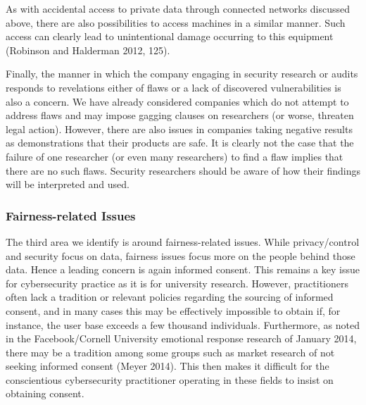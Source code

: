 \documentclass{svjour3}                     %
\begin{document}
As with accidental access to private data through connected networks discussed above, there are also possibilities to access machines in a similar manner. Such access can clearly lead to unintentional damage occurring to this equipment (Robinson and Halderman 2012, 125).

Finally, the manner in which the company engaging in security research or audits responds to revelations either of flaws or a lack of discovered vulnerabilities is also a concern. We have already considered companies which do not attempt to address flaws and may impose gagging clauses on researchers (or worse, threaten legal action). However, there are also issues in companies taking negative results as demonstrations that their products are safe. It is clearly not the case that the failure of one researcher (or even many researchers) to find a flaw implies that there are no such flaws. Security researchers should be aware of how their findings will be interpreted and used.

\subsubsection{Fairness-related Issues}
The third area we identify is around fairness-related issues. While privacy/control and security focus on data, fairness issues focus more on the people behind those data. Hence a leading concern is again informed consent.  This remains a key issue for cybersecurity practice as it is for university research.  However, practitioners often lack a tradition or relevant policies regarding the sourcing of informed consent, and in many cases this may be effectively impossible to obtain if, for instance, the user base exceeds a few thousand individuals. Furthermore, as noted in the Facebook/Cornell University emotional response research of January 2014, there may be a tradition among some groups such as market research of not seeking informed consent (Meyer 2014). This then makes it difficult for the conscientious cybersecurity practitioner operating in these fields to insist on obtaining consent.
\end{document}
